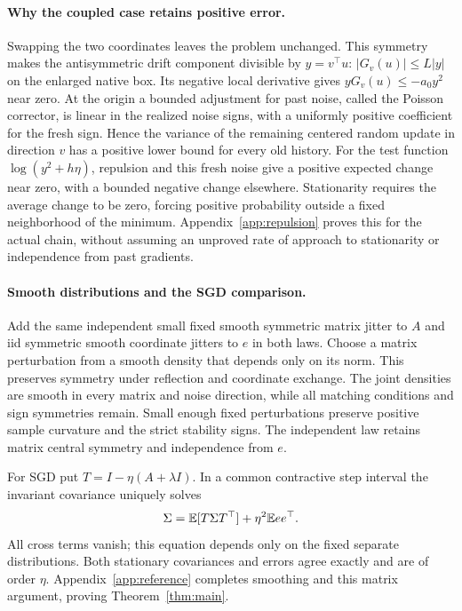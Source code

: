 \paragraph{Why the coupled case retains positive error.}
Swapping the two coordinates leaves the problem unchanged. This symmetry
makes the antisymmetric drift component divisible by
$y=v^\top u$: $|G_v(u)|\leq L|y|$ on the enlarged native box. Its
negative local derivative gives $yG_v(u)\leq-a_0y^2$ near zero. At the
origin a bounded adjustment for past noise, called the Poisson corrector,
is linear in the realized noise signs, with
a uniformly positive coefficient for the fresh sign. Hence the variance of
the remaining centered random update in direction $v$ has a positive lower
bound for every old history. For the test function $\log(y^2+h\eta)$,
repulsion and this fresh noise give a positive expected change near zero,
with a bounded negative change elsewhere. Stationarity requires the average
change to be zero, forcing positive probability outside a fixed neighborhood
of the minimum. Appendix~\ref{app:repulsion} proves this for the actual
chain, without assuming an unproved rate of approach to stationarity or
independence from past gradients.

\paragraph{Smooth distributions and the SGD comparison.}
Add the same independent small fixed smooth symmetric matrix jitter to $A$
and iid symmetric smooth coordinate jitters to $e$ in both laws. Choose a
matrix perturbation from a smooth density that depends only on its norm.
This preserves symmetry under reflection and coordinate exchange. The joint
densities are smooth in every matrix and noise direction, while all matching
conditions and sign symmetries remain. Small enough fixed perturbations
preserve positive sample curvature and the strict stability signs. The
independent law retains matrix central symmetry and independence from $e$.

For SGD put $T=I-\eta(A+\lambda I)$. In a common contractive step interval
the invariant covariance uniquely solves
\begin{equation}\label{eq:SGD-matrix}
 \Sigma=\mathbb E[T\Sigma T^\top]+\eta^2\mathbb E ee^\top.
\end{equation}
All cross terms vanish; this equation depends only on the fixed separate
distributions. Both stationary covariances and errors agree exactly and are of order
$\eta$. Appendix~\ref{app:reference} completes smoothing and this matrix
argument, proving Theorem~\ref{thm:main}.


